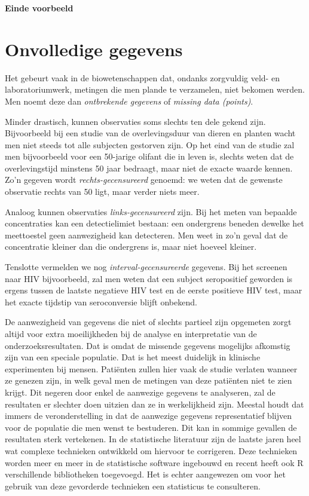 \documentclass[
  12pt,dutch]{book}
\theoremstyle{definition}
\theoremstyle{definition}
\theoremstyle{definition}
\theoremstyle{definition}
\theoremstyle{remark}
\begin{document}
\textbf{Einde voorbeeld}

\section{Onvolledige gegevens}\label{sec:missing}

Het gebeurt vaak in de biowetenschappen dat, ondanks zorgvuldig veld- en laboratoriumwerk, metingen die men plande te verzamelen, niet bekomen werden. Men noemt deze dan \emph{ontbrekende gegevens} of \emph{missing data (points)}.

Minder drastisch, kunnen observaties soms slechts ten dele gekend zijn.
Bijvoorbeeld bij een studie van de overlevingsduur van dieren en planten wacht men niet steeds tot
alle subjecten gestorven zijn. Op het eind van de studie zal men bijvoorbeeld voor een 50-jarige
olifant die in leven is, slechts weten dat de overlevingstijd
minstens 50 jaar bedraagt, maar niet de exacte waarde kennen. Zo'n gegeven
wordt \emph{rechts-gecensureerd} genoemd: we weten dat de gewenste
observatie rechts van 50 ligt, maar verder niets meer.

Analoog kunnen observaties \emph{links-gecensureerd} zijn. Bij het meten
van bepaalde concentraties kan een detectielimiet bestaan: een ondergrens beneden
dewelke het meettoestel geen aanwezigheid kan detecteren. Men weet in zo'n
geval dat de concentratie kleiner dan die ondergrens is, maar niet hoeveel
kleiner.

Tenslotte vermelden we nog \emph{interval-gecensureerde} gegevens. Bij het
screenen naar HIV bijvoorbeeld, zal men weten dat een subject seropositief
geworden is ergens tussen de laatste negatieve HIV test en de eerste
positieve HIV test, maar het exacte tijdstip van seroconversie blijft
onbekend.

De aanwezigheid van gegevens die niet of slechts partieel zijn opgemeten zorgt
altijd voor extra moeilijkheden bij de analyse en interpretatie van de
onderzoeksresultaten. Dat is omdat de missende gegevens mogelijks afkomstig zijn
van een speciale populatie. Dat is het meest duidelijk in klinische experimenten bij mensen.
Patiënten zullen hier vaak de studie verlaten wanneer
ze genezen zijn, in welk geval men de metingen van deze patiënten niet te
zien krijgt. Dit negeren door enkel de aanwezige gegevens te analyseren, zal
de resultaten er slechter doen uitzien dan ze in werkelijkheid zijn. Meestal
houdt dat immers de veronderstelling in dat de aanwezige gegevens representatief blijven
voor de populatie die men wenst te bestuderen. Dit kan in sommige gevallen
de resultaten sterk vertekenen. In de statistische literatuur zijn de
laatste jaren heel wat complexe technieken ontwikkeld om hiervoor te
corrigeren. Deze technieken worden meer en meer in de statistische software
ingebouwd en recent heeft ook R verschillende bibliotheken toegevoegd.
Het is
echter aangewezen om voor het gebruik van deze gevorderde technieken een
statisticus te consulteren.
\end{document}
